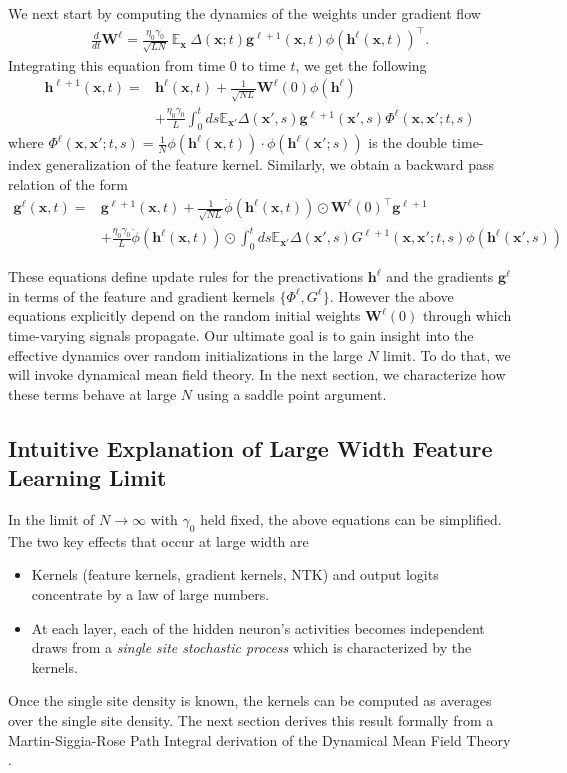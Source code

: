\documentclass{article} %
\def\h{\bm h}
\def\x{\bm x}
\def\g{\bm g}
\def\W{\bm W}
\begin{document}
We next start by computing the dynamics of the weights under gradient flow
\begin{align}
    \frac{d}{dt} \W^{\ell} = \frac{\eta_0 \gamma_0}{\sqrt{L N}} \ \mathbb{E}_{\x} \ \Delta(\x;t) \g^{\ell+1}(\x,t) \phi(\h^\ell(\x,t))^\top  .
\end{align}
Integrating this equation from time $0$ to time $t$, we get the following 
\begin{align}
    \h^{\ell+1}(\x,t) =& \h^{\ell}(\x,t) + \frac{1}{\sqrt{N L}} \W^\ell(0) \phi(\h^\ell) \nonumber
    \\
    &+ \frac{\eta_0 \gamma_0}{L} \int_0^t ds \mathbb{E}_{\x'} \Delta(\x',s) \g^{\ell+1}(\x',s) \Phi^{\ell}(\x,\x';t,s)
\end{align}
where $\Phi^{\ell}(\x,\x';t,s) = \frac{1}{N} \phi(\h^\ell(\x,t)) \cdot \phi(\h^\ell(\x';s))$ is the double time-index generalization of the feature kernel. Similarly, we obtain a backward pass relation of the form
\begin{align}
    \g^{\ell}(\x,t) =& \g^{\ell+1}(\x,t) + \frac{1}{\sqrt{NL}} \dot\phi(\h^\ell(\x,t)) \odot  \W^{\ell}(0)^\top \g^{\ell+1} \nonumber
    \\
    &+ \frac{\eta_0 \gamma_0}{L}  \dot\phi(\h^\ell(\x,t)) \odot  \int_0^t ds   \mathbb{E}_{\x'} \Delta(\x',s)  G^{\ell+1}(\x,\x';t,s) \phi(\h^\ell(\x',s))
\end{align}

These equations define update rules for the preactivations $\h^\ell$ and the gradients $\g^\ell$ in terms of the feature and gradient kernels $\{ \Phi^\ell,  G^{\ell} \}$. However the above equations explicitly depend on the random initial weights $\W^\ell(0)$ through which time-varying signals propagate. Our ultimate goal is to gain insight into the effective dynamics over random initializations in the large $N$ limit. To do that, we will invoke dynamical mean field theory. In the next section, we characterize how these terms behave at large $N$ using a saddle point argument. 

\subsection{Intuitive Explanation of Large Width Feature Learning Limit}

In the limit of $N \to \infty$ with $\gamma_0$ held fixed, the above equations can be simplified. The two key effects that occur at large width are
\begin{itemize}
    \item Kernels (feature kernels, gradient kernels, NTK) and output logits concentrate by a law of large numbers.
    \item At each layer, each of the hidden neuron's activities becomes independent draws from a \textit{single site stochastic process} which is characterized by the kernels. 
\end{itemize}
Once the single site density is known, the kernels can be computed as averages over the single site density. The next section derives this result formally from a Martin-Siggia-Rose Path Integral derivation of the Dynamical Mean Field Theory \citep{martin1973statistical}. 
\end{document}
